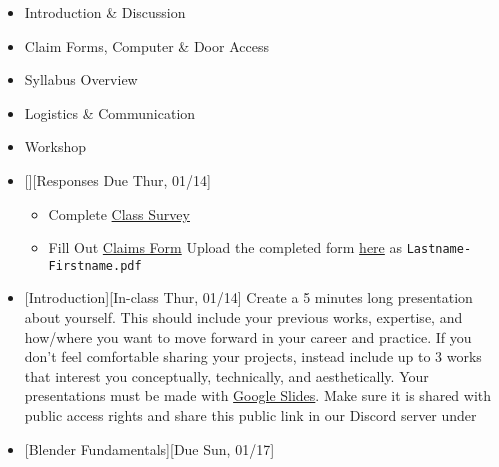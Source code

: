 \def\dMon{Mon, 01/11}
\def\dTues{Tues, 01/12}
\def\dWed{Wed, 01/13}
\def\dThur{Thur, 01/14}
\def\dFri{Fri, 01/15}
\def\dSat{Sat, 01/16}
\def\dSun{Sun, 01/17}
\placeDate

\begin{itemize}[noitemsep,topsep=0pt,leftmargin=*]
      \item Introduction \& Discussion
      \item Claim Forms, Computer \& Door Access
      \item Syllabus Overview
      \item Logistics \& Communication
      \item Workshop
\end{itemize}
\vspace{1em}
\begin{itemize}[noitemsep,topsep=0pt,leftmargin=*]
      \item {}[][Responses Due \dThur]
            \begin{itemize}
                  \item Complete \href{https://forms.gle/MnFLmcqK7PUiKwra7}{Class Survey}
                  \item Fill Out \href{https://drive.google.com/file/d/1SeksTmFmQa6uehrmoSIL_uO8tuORo0P3/view}{Claims Form}
                        \newline Upload the completed form \href{https://osu.app.box.com/f/eb897914f2e94a08aace11a93668c046}{here} as \texttt{Lastname-Firstname.pdf}
            \end{itemize}
            \item {}[Introduction][In-class \dThur] \newline Create a 5 minutes long presentation about yourself. This should include your previous works, expertise, and how/where you want to move forward in your career and practice. If you don't feel comfortable sharing your projects, instead include up to 3 works that interest you conceptually, technically, and aesthetically. Your presentations must be made with \href{https://docs.google.com/presentation/}{Google Slides}. Make sure it is shared with public access rights and share this public link in our Discord server under 
      \item {}[Blender Fundamentals][Due \dSun]

\end{itemize}
